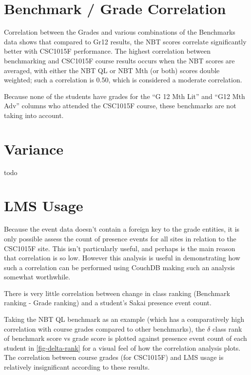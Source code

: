 \section{Benchmark / Grade Correlation}
Correlation between the Grades and various combinations of the Benchmarks data shows that compared to Gr12 results, the NBT scores correlate significantly better with CSC1015F performance. The highest correlation between benchmarking and CSC1015F course results occurs when the NBT scores are averaged, with either the NBT QL or NBT Mth (or both) scores double weighted; such a correlation is 0.50, which is considered a moderate correlation.

Because none of the students have grades for the ``G 12 Mth Lit'' and ``G12 Mth Adv'' columns who attended the CSC1015F course, these benchmarks are not taking into account.

\section{Variance}
todo

\section{LMS Usage}
Because the event data doesn't contain a foreign key to the grade entities, it is only possible assess the count of presence events for all sites in relation to the CSC1015F site. This isn't particularly useful, and perhaps is the main reason that correlation is so low. However this analysis is useful in demonstrating how such a correlation can be performed using CouchDB making such an analysis somewhat worthwhile.


There is very little correlation between change in class ranking (Benchmark ranking - Grade ranking) and a student's Sakai presence event count.

Taking the NBT QL benchmark as an example (which has a comparatively high correlation with course grades compared to other benchmarks), the \( \delta \) class rank of benchmark score vs grade score is plotted against presence event count of each student in \ref{fig-delta-rank} for a visual feel of how the correlation analysis plots. The correlation between course grades (for CSC1015F) and LMS usage is relatively insignificant according to these results.

